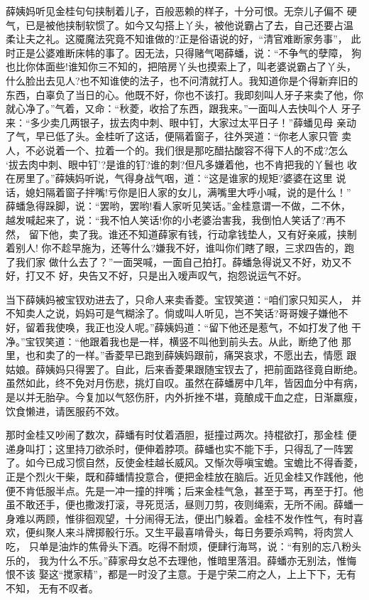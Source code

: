 薛姨妈听见金桂句句挟制着儿子，百般恶赖的样子，十分可恨。无奈儿子偏不
硬气，已是被他挟制软惯了。如今又勾搭上丫头，被他说霸占了去，自己还要占温
柔让夫之礼。这魇魔法究竟不知谁做的?正是俗语说的好，“清官难断家务事”，
此时正是公婆难断床帏的事了。因无法，只得赌气喝薛蟠，说：“不争气的孽障，
狗也比你体面些!谁知你三不知的，把陪房丫头也摸索上了，叫老婆说霸占了丫头，
什么脸出去见人?也不知谁使的法子，也不问清就打人。我知道你是个得新弃旧的
东西，白辜负了当日的心。他既不好，你也不该打。我即刻叫人牙子来卖了他，你
就心净了。”气着，又命：“秋菱，收拾了东西，跟我来。”一面叫人去快叫个人
牙子来：“多少卖几两银子，拔去肉中刺、眼中钉，大家过太平日子！”薛蟠见母
亲动了气，早已低了头。金桂听了这话，便隔着窗子，往外哭道：“你老人家只管
卖人，不必说着一个、拉着一个的。我们很是那吃醋拈酸容不得下人的不成?怎么
‘拔去肉中刺、眼中钉’?是谁的钉?谁的刺?但凡多嫌着他，也不肯把我的丫鬟也
收在房里了。”薛姨妈听说，气得身战气咽，道：“这是谁家的规矩?婆婆在这里
说话，媳妇隔着窗子拌嘴!亏你是旧人家的女儿，满嘴里大呼小喊，说的是什么！”
薛蟠急得跺脚，说：“罢哟，罢哟!看人家听见笑话。”金桂意谓一不做，二不休，
越发喊起来了，说：“我不怕人笑话!你的小老婆治害我，我倒怕人笑话了?再不然，
留下他，卖了我。谁还不知道薛家有钱，行动拿钱垫人，又有好亲戚，挟制着别人!
你不趁早施为，还等什么?嫌我不好，谁叫你们瞎了眼，三求四告的，跑了我们家
做什么去了？”一面哭喊，一面自己拍打。薛蟠急得说又不好，劝又不好，打又不
好，央告又不好，只是出入嗳声叹气，抱怨说运气不好。

当下薛姨妈被宝钗劝进去了，只命人来卖香菱。宝钗笑道：“咱们家只知买人，
并不知卖人之说，妈妈可是气糊涂了。倘或叫人听见，岂不笑话?哥哥嫂子嫌他不
好，留着我使唤，我正也没人呢。”薛姨妈道：“留下他还是惹气，不如打发了他
干净。”宝钗笑道：“他跟着我也是一样，横竖不叫他到前头去。从此，断绝了他
那里，也和卖了的一样。”香菱早已跑到薛姨妈跟前，痛哭哀求，不愿出去，情愿
跟姑娘。薛姨妈只得罢了。自此，后来香菱果跟随宝钗去了，把前面路径竟自断绝。
虽然如此，终不免对月伤悲，挑灯自叹。虽然在薛蟠房中几年，皆因血分中有病，
是以并无胎孕。今复加以气怒伤肝，内外折挫不堪，竟酿成干血之症，日渐羸瘦，
饮食懒进，请医服药不效。

那时金桂又吵闹了数次，薛蟠有时仗着酒胆，挺撞过两次。持棍欲打，那金桂
便递身叫打；这里持刀欲杀时，便伸着脖项。薛蟠也实不能下手，只得乱了一阵罢
了。如今已成习惯自然，反使金桂越长威风。又惭次辱嗔宝蟾。宝蟾比不得香菱，
正是个烈火干柴，既和薛蟠情投意合，便把金桂放在脑后。近见金桂又作践他，他
便不肯低服半点。先是一冲一撞的拌嘴；后来金桂气急，甚至于骂，再至于打。他
虽不敢还手，便也撒泼打滚，寻死觅活，昼则刀剪，夜则绳索，无所不闹。薛蟠一
身难以两顾，惟徘徊观望，十分闹得无法，便出门躲着。金桂不发作性气，有时喜
欢，便纠聚人来斗牌掷骰行乐。又生平最喜啃骨头，每日务要杀鸡鸭，将肉赏人吃，
只单是油炸的焦骨头下酒。吃得不耐烦，便肆行海骂，说：“有别的忘八粉头乐的，
我为什么不乐。”薛家母女总不去理他，惟暗里落泪。薛蟠亦无别法，惟悔恨不该
娶这“搅家精”，都是一时没了主意。于是宁荣二府之人，上上下下，无有不知，
无有不叹者。

